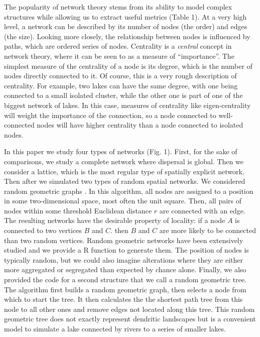 \documentclass[12pt]{article}
\begin{document}
The popularity of network theory stems from its ability to model complex
structures while allowing us to extract useful metrics (Table 1). At a very high
level, a network can be described by its number of nodes (the order) and 
edges (the size). Looking more closely, the relationship between
nodes is influenced by paths, which are ordered series of nodes. Centrality
is a \emph{central} concept in network theory, where it can be seen
to as a measure of ``importance''. The simplest measure of the centrality of a
node is its degree, which is the number of nodes directly connected to it. Of
course, this is a very rough description of centrality. For example, two lakes
can have the same degree, with one being connected to a small isolated cluster,
while the other one is part of one of the biggest network of lakes. In this case,
measures of centrality like eigen-centrality will weight the importance of the
connection, so a node connected to well-connected nodes will have higher
centrality than a node connected to isolated nodes.

In this paper we study four types of networks (Fig. 1). First, for the sake of
comparisons, we study a complete network where dispersal is global. Then we
consider a lattice, which is the most regular type of spatially explicit
network. Then after we simulated two types of random spatial networks. We
considered random geometric graphs \parencite{sed01}. In this algorithm, all
nodes are assigned to a position in some two-dimensional space, most often the
unit square. Then, all pairs of nodes within some threshold Euclidean distance
$r$ are connected with an edge. The resulting networks have the desirable
property of locality: if a node $A$ is connected to two vertices $B$ and $C$.
then $B$ and $C$ are more likely to be connected than two random vertices.
Random geometric networks have been extensively studied \parencite{app97a,
app97b, app02a, app02b, pen03} and we provide a R function to generate them. The
position of nodes is typically random, but we could also imagine alterations
where they are either more aggregated or segregated than expected by chance
alone. Finally, we also provided the code for a second structure that we call a
random geometric tree. The algorithm first builds a random geometric graph, then
selects a node from which to start the tree. It then calculates the the shortest
path tree \parencite{dij59} from this node to all other ones and remove edges
not located along this tree. This random geometric tree does not exactly
represent dendritic landscapes but is a convenient model to simulate a lake
connected by rivers to a series of smaller lakes.
\end{document}

